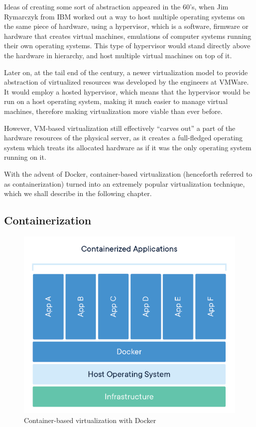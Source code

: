 \documentclass[thesis=B,english]{FITthesis}[2019/12/23]
\begin{document}
Ideas of creating some sort of abstraction appeared in the 60’s, when Jim Rymarczyk from IBM worked out a way to host multiple operating systems on the same piece of hardware, using a hypervisor, which is a software, firmware or hardware that creates virtual machines, emulations of computer systems running their own operating systems. This type of hypervisor would stand directly above the hardware in hierarchy, and host multiple virtual machines on top of it. \cite{virtualization}

Later on, at the tail end of the century, a newer virtualization model to provide abstraction of virtualized resources was developed by the engineers at VMWare. \cite{vmware} It would employ a hosted hypervisor, which means that the hypervisor would be run on a host operating system, making it much easier to manage virtual machines, therefore making virtualization more viable than ever before. \cite{virtualization}

However, VM-based virtualization still effectively “carves out” a part of the hardware resources of the physical server, as it creates a full-fledged operating system which treats its allocated hardware as if it was the only operating system running on it.

With the advent of Docker, container-based virtualization (henceforth referred to as containerization) turned into an extremely popular virtualization technique, which we shall describe in the following chapter. 


\subsection{Containerization}

\begin{figure}[H]
\centering
\caption{Container-based virtualization with Docker \cite{what-container}}
\hspace*{-0.65cm}
\includegraphics[scale=0.75]{containerization}
\end{figure}
\end{document}
